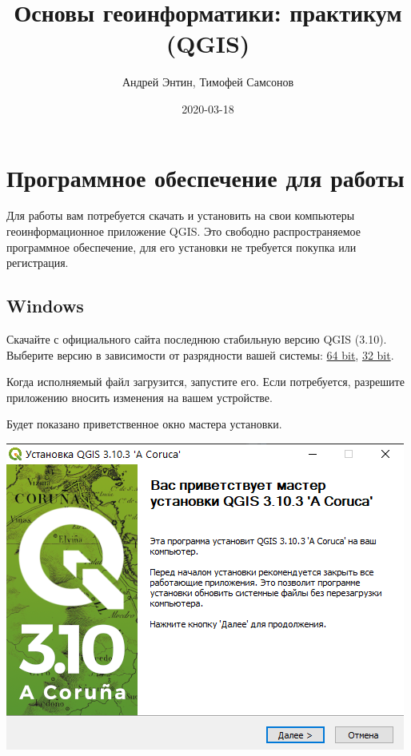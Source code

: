 \documentclass[
  12pt,
]{book}
\title{Основы геоинформатики: практикум (QGIS)}
\author{Андрей Энтин, Тимофей Самсонов}
\date{2020-03-18}
\begin{document}
\maketitle

{
\hypersetup{linkcolor=}
\setcounter{tocdepth}{1}
\tableofcontents
}
\hypertarget{ux43fux440ux43eux433ux440ux430ux43cux43cux43dux43eux435-ux43eux431ux435ux441ux43fux435ux447ux435ux43dux438ux435-ux434ux43bux44f-ux440ux430ux431ux43eux442ux44b}{%
\chapter*{Программное обеспечение для работы}\label{ux43fux440ux43eux433ux440ux430ux43cux43cux43dux43eux435-ux43eux431ux435ux441ux43fux435ux447ux435ux43dux438ux435-ux434ux43bux44f-ux440ux430ux431ux43eux442ux44b}}

Для работы вам потребуется скачать и установить на свои компьютеры геоинформационное приложение QGIS. Это свободно распространяемое программное обеспечение, для его установки не требуется покупка или регистрация.

\hypertarget{windows}{%
\section*{Windows}\label{windows}}

Скачайте с официального сайта последнюю стабильную версию QGIS (3.10). Выберите версию в зависимости от разрядности вашей системы: \href{https://qgis.org/downloads/QGIS-OSGeo4W-3.10.3-3-Setup-x86_64.exe}{64 bit}, \href{https://qgis.org/downloads/QGIS-OSGeo4W-3.10.3-3-Setup-x86.exe}{32 bit}.

Когда исполняемый файл загрузится, запустите его. Если потребуется, разрешите приложению вносить изменения на вашем устройстве.

Будет показано приветственное окно мастера установки.

\includegraphics{images/installation_instruction_win/win01.png}
\end{document}
